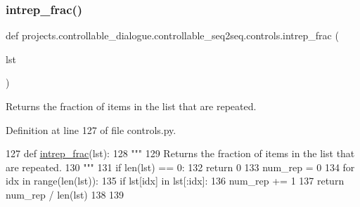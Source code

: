 \mbox{\label{namespaceprojects_1_1controllable__dialogue_1_1controllable__seq2seq_1_1controls_a6774bd6ac8941123de4574e69686140a}} 
\subsubsection{\texorpdfstring{intrep\+\_\+frac()}{intrep\_frac()}}
{\footnotesize\ttfamily def projects.\+controllable\+\_\+dialogue.\+controllable\+\_\+seq2seq.\+controls.\+intrep\+\_\+frac (\begin{DoxyParamCaption}\item[{}]{lst }\end{DoxyParamCaption})}

\begin{DoxyVerb}Returns the fraction of items in the list that are repeated.
\end{DoxyVerb}
 

Definition at line 127 of file controls.\+py.


\begin{DoxyCode}
127 \textcolor{keyword}{def }\hyperlink{namespaceprojects_1_1controllable__dialogue_1_1controllable__seq2seq_1_1controls_a6774bd6ac8941123de4574e69686140a}{intrep\_frac}(lst):
128     \textcolor{stringliteral}{"""}
129 \textcolor{stringliteral}{    Returns the fraction of items in the list that are repeated.}
130 \textcolor{stringliteral}{    """}
131     \textcolor{keywordflow}{if} len(lst) == 0:
132         \textcolor{keywordflow}{return} 0
133     num\_rep = 0
134     \textcolor{keywordflow}{for} idx \textcolor{keywordflow}{in} range(len(lst)):
135         \textcolor{keywordflow}{if} lst[idx] \textcolor{keywordflow}{in} lst[:idx]:
136             num\_rep += 1
137     \textcolor{keywordflow}{return} num\_rep / len(lst)
138 
139 
\end{DoxyCode}
\mbox{\label{namespaceprojects_1_1controllable__dialogue_1_1controllable__seq2seq_1_1controls_a96e1d28cd5e6769d118b0b8b339213e9}} 
